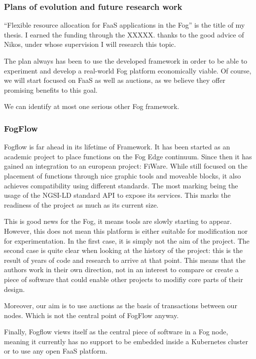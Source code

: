 \documentclass[11pt]{sdm}
\begin{document}
\subsubsection{Plans of evolution and future research work}

“Flexible resource allocation for \gls{FaaS} applications in the Fog” is the title of my thesis.
I earned the funding through the XXXXX.  thanks to the good advice of Nikos, under whose supervision I will research this topic.

The plan always has been to use the developed framework in order to be able to experiment and develop a real-world Fog platform economically viable. Of course, we will start focused on \gls{FaaS} as well as auctions, as we believe they offer promising benefits to this goal.

\iffalse
We can identify at most one serious other Fog framework.

\subsubsection{FogFlow}

Fogflow is far ahead in its lifetime of Framework. It has been started as an academic project to place functions on the Fog Edge continuum. Since then it has gained an integration to an european project: FiWare. While still focused on the placement of functions through nice graphic tools and moveable blocks, it also achieves compatibility using different standards. The most marking being the usage of the NGSI-LD standard API to expose its services. This marks the readiness of the project as much as its current size.

This is good news for the Fog, it means tools are slowly starting to appear. However, this does not mean this platform is either suitable for modification nor for experimentation. In the first case, it is simply not the aim of the project. The second case is quite clear when looking at the history of the project: this is the result of years of code and research to arrive at that point. This means that the authors work in their own direction, not in an interest to compare or create a piece of software that could enable other projects to modifiy core parts of their design.

Moreover, our aim is to use auctions as the basis of transactions between our nodes. Which is not the central point of FogFlow anyway.

Finally, Fogflow views itself as the central piece of software in a Fog node, meaning it currently has no support to be embedded inside a Kubernetes cluster or to use any open \gls{FaaS} platform.
\end{document}
